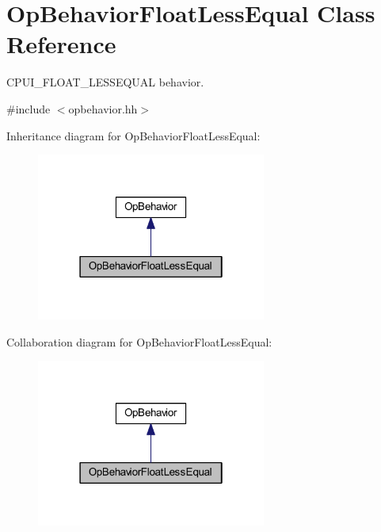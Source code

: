 \hypertarget{class_op_behavior_float_less_equal}{}\section{Op\+Behavior\+Float\+Less\+Equal Class Reference}
\label{class_op_behavior_float_less_equal}


C\+P\+U\+I\+\_\+\+F\+L\+O\+A\+T\+\_\+\+L\+E\+S\+S\+E\+Q\+U\+AL behavior.  




{\ttfamily \#include $<$opbehavior.\+hh$>$}



Inheritance diagram for Op\+Behavior\+Float\+Less\+Equal\+:
\nopagebreak
\begin{figure}[H]
\begin{center}
\leavevmode
\includegraphics[width=214pt]{class_op_behavior_float_less_equal__inherit__graph}
\end{center}
\end{figure}


Collaboration diagram for Op\+Behavior\+Float\+Less\+Equal\+:
\nopagebreak
\begin{figure}[H]
\begin{center}
\leavevmode
\includegraphics[width=214pt]{class_op_behavior_float_less_equal__coll__graph}
\end{center}
\end{figure}
